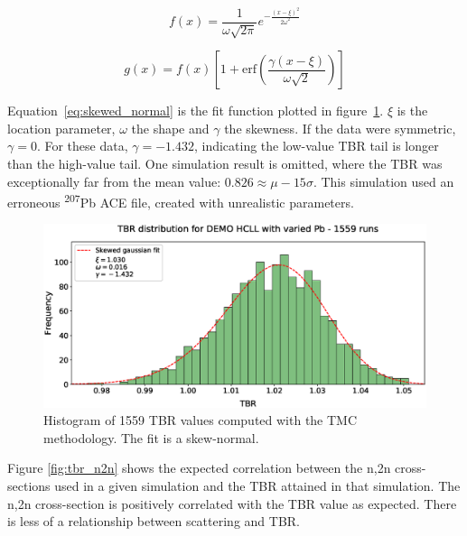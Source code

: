 \begin{equation}
  \label{eq:normal}
  f(x) = \frac{1}{\omega \sqrt{2 \pi}} e^{-\frac{(x-\xi)^{2}}{2 \omega^{2}}}
\end{equation}

\begin{equation}
  \label{eq:skewed_normal}
  g(x) = f(x) \left[1 + \mathrm{erf} \left( \frac{\gamma(x - \xi)}{\omega \sqrt{2}} \right) \right]
\end{equation}

Equation~\ref{eq:skewed_normal} is the fit function plotted in figure~\ref{fig:tbr_distribution}. $\xi$ is the location parameter, $\omega$ the shape and $\gamma$ the skewness. If the data were symmetric, $\gamma = 0$. For these data, $\gamma = -1.432$, indicating the low-value TBR tail is longer than the high-value tail. One simulation result is omitted, where the TBR was exceptionally far from the mean value: $0.826 \approx \mu - 15\sigma$. This simulation used an erroneous \textsuperscript{207}Pb ACE file, created with unrealistic parameters.

\begin{figure}[H]
	\includegraphics[width=\textwidth]{hcll_hist_1559}
	\caption{Histogram of 1559 TBR values computed with the TMC methodology. The fit is a skew-normal.}
	\label{fig:tbr_distribution}
\end{figure}

Figure \ref{fig:tbr_n2n} shows the expected correlation between the n,2n cross-sections used in a given simulation and the TBR attained in that simulation. The n,2n cross-section is positively correlated with the TBR value as expected. There is less of a relationship between scattering and TBR.

